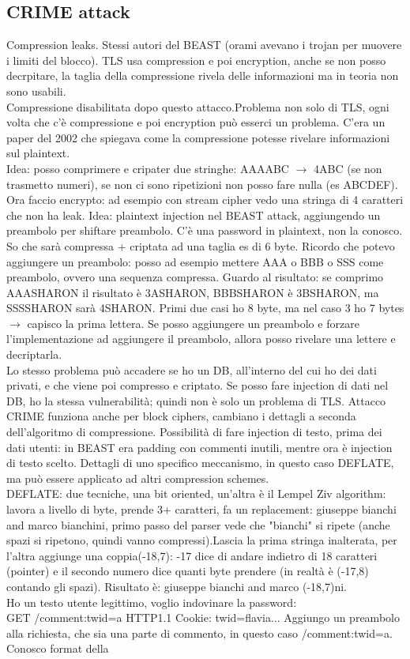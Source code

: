 \documentclass[16px]{article}
\begin{document}
\subsection{CRIME attack}
Compression leaks. Stessi autori del BEAST (orami avevano i trojan per muovere i limiti del blocco). TLS usa compression e poi encryption, anche se non posso decrpitare, la taglia della compressione rivela delle informazioni ma in teoria non sono usabili.\\ Compressione disabilitata dopo questo attacco.Problema non solo di TLS, ogni volta che c'è compressione e poi encryption può esserci un problema. C'era un paper del 2002 che spiegava come la compressione potesse rivelare informazioni sul plaintext.\\ Idea: posso comprimere e cripater due stringhe: AAAABC $\rightarrow$ 4ABC (se non trasmetto numeri), se non ci sono ripetizioni non posso fare nulla (es ABCDEF). Ora faccio encrypto: ad esempio con stream cipher vedo una stringa di 4 caratteri che non ha leak. Idea: plaintext injection nel BEAST attack, aggiungendo un preambolo per shiftare preambolo. C'è una password in plaintext, non la conosco. So che sarà compressa + criptata ad una taglia es di 6 byte. Ricordo che potevo aggiungere un preambolo: posso ad esempio mettere AAA o BBB o SSS come preambolo, ovvero una sequenza compressa. Guardo al risultato: se comprimo AAASHARON il risultato è 3ASHARON, BBBSHARON è 3BSHARON, ma SSSSHARON sarà 4SHARON. Primi due casi ho 8 byte, ma nel caso 3 ho 7 bytes $\rightarrow$ capisco la prima lettera. Se posso aggiungere un preambolo e forzare l'implementazione ad aggiungere il preambolo, allora posso rivelare una lettere e decriptarla.\\ Lo stesso problema può accadere se ho un DB, all'interno del cui ho dei dati privati, e che viene poi compresso e criptato. Se posso fare injection di dati nel DB, ho la stessa vulnerabilità; quindi non è solo un problema di TLS. Attacco CRIME funziona anche per block ciphers, cambiano i dettagli a seconda dell'algoritmo di compressione. Possibilità di fare injection di testo, prima dei dati utenti: in BEAST era padding con commenti inutili, mentre ora è injection di testo scelto. Dettagli di uno specifico meccanismo, in questo caso DEFLATE, ma può essere applicato ad altri compression schemes.\\DEFLATE: due tecniche, una bit oriented, un'altra è il Lempel Ziv algorithm: lavora a livello di byte, prende 3+ caratteri, fa un replacement: giuseppe bianchi and marco bianchini, primo passo del parser vede che "bianchi" si ripete (anche spazi si ripetono, quindi vanno compressi).Lascia la prima stringa inalterata, per l'altra aggiunge una coppia(-18,7): -17 dice di andare indietro di 18 caratteri (pointer) e il secondo numero dice quanti byte prendere (in realtà è (-17,8) contando gli spazi). Risultato è: giuseppe bianchi and marco (-18,7)ni.\\ Ho un testo utente legittimo, voglio indovinare la password:\\ GET /comment:twid=a HTTP1.1 Cookie: twid=flavia... Aggiungo un preambolo alla richiesta, che sia una parte di commento, in questo caso /comment:twid=a. Conosco format della 
\end{document}
